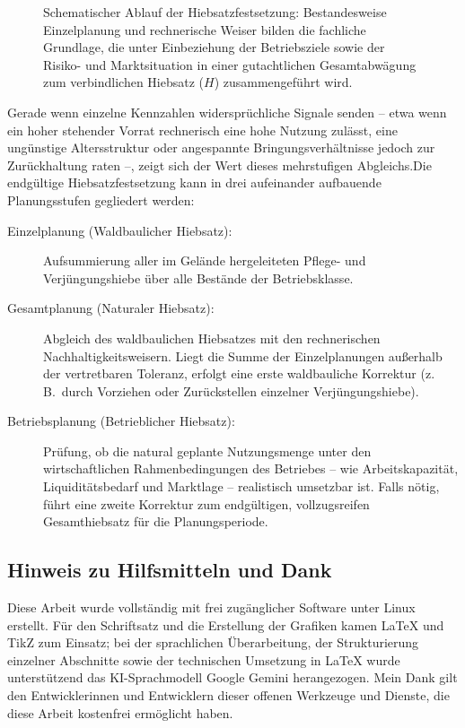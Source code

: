 \documentclass[twocolumn, paper=a4, fontsize=10pt]{scrartcl}
\begin{document}
\begin{figure}[!htbp]
\caption{Schematischer Ablauf der Hiebsatzfestsetzung: Bestandesweise Einzelplanung und rechnerische Weiser bilden die fachliche Grundlage, die unter Einbeziehung der Betriebsziele sowie der Risiko- und Marktsituation in einer gutachtlichen Gesamtabwägung zum verbindlichen Hiebsatz ($H$) zusammengeführt wird.}
\label{fig:hiebsatz_abwaegung}
\end{figure}

Gerade wenn einzelne Kennzahlen widersprüchliche Signale senden -- etwa wenn ein hoher stehender Vorrat rechnerisch eine hohe Nutzung zulässt, eine ungünstige Altersstruktur oder angespannte Bringungsverhältnisse jedoch zur Zurückhaltung raten --, zeigt sich der Wert dieses mehrstufigen Abgleichs.Die endgültige Hiebsatzfestsetzung kann in drei aufeinander aufbauende Planungsstufen gegliedert werden:

\begin{description}
\item[Einzelplanung (Waldbaulicher Hiebsatz):] Aufsummierung aller im Gelände hergeleiteten Pflege- und Verjüngungshiebe über alle Bestände der Betriebsklasse.
\item[Gesamtplanung (Naturaler Hiebsatz):] Abgleich des waldbaulichen Hiebsatzes mit den rechnerischen Nachhaltigkeitsweisern. Liegt die Summe der Einzelplanungen außerhalb der vertretbaren Toleranz, erfolgt eine erste waldbauliche Korrektur (z.\,B.\ durch Vorziehen oder Zurückstellen einzelner Verjüngungshiebe).
\item[Betriebsplanung (Betrieblicher Hiebsatz):] Prüfung, ob die natural geplante Nutzungsmenge unter den wirtschaftlichen Rahmenbedingungen des Betriebes -- wie Arbeitskapazität, Liquiditätsbedarf und Marktlage -- realistisch umsetzbar ist. Falls nötig, führt eine zweite Korrektur zum endgültigen, vollzugsreifen Gesamthiebsatz für die Planungsperiode.
\end{description}

\subsection*{Hinweis zu Hilfsmitteln und Dank}

Diese Arbeit wurde vollständig mit frei zugänglicher Software unter Linux erstellt. Für den Schriftsatz und die Erstellung der Grafiken kamen \LaTeX{} und TikZ zum Einsatz; bei der sprachlichen Überarbeitung, der Strukturierung einzelner Abschnitte sowie der technischen Umsetzung in \LaTeX{} wurde unterstützend das KI-Sprachmodell Google Gemini herangezogen. Mein Dank gilt den Entwicklerinnen und Entwicklern dieser offenen Werkzeuge und Dienste, die diese Arbeit kostenfrei ermöglicht haben.
\end{document}
